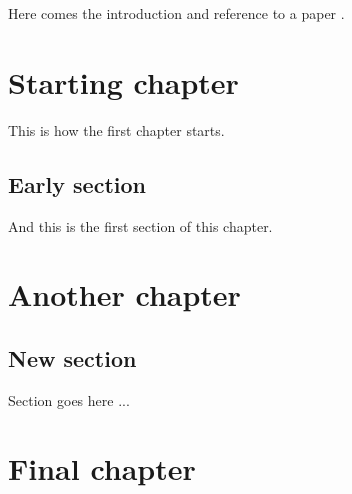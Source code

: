 \documentclass[12pt,twoside]{article} %
\begin{document}
Here comes the introduction and reference to a paper \cite{Konr01cm}.

\section{Starting chapter}  %

This is how the first chapter starts.

\subsection{Early section}  %

And this is the first section of this chapter.

\section{Another chapter}  %

\subsection{New section}  %

Section goes here ...

\section{Final chapter}  %
\end{document}
